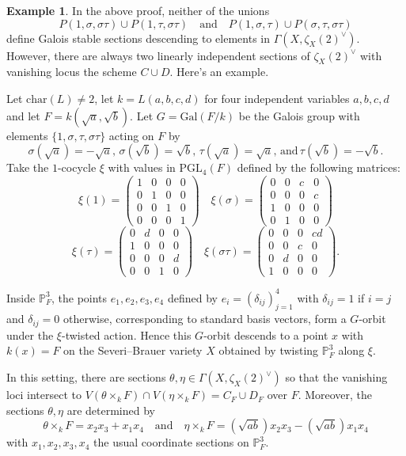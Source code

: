 \documentclass[12pt]{amsart}
\theoremstyle{definition}
\newtheorem{exmp}[thm]{Example}
\begin{document}
\begin{exmp}
In the above proof, neither of the unions \[P(1,\sigma,\sigma\tau)\cup P(1,\tau,\sigma\tau)\quad \mbox{and}\quad  P(1,\sigma,\tau)\cup P(\sigma,\tau,\sigma\tau)\] define Galois stable sections descending to elements in $\Gamma(X,\zeta_X(2)^\vee)$. However, there are always two linearly independent sections of $\zeta_X(2)^\vee$ with vanishing locus the scheme $C\cup D$. Here's an example.

Let $\mathrm{char}(L)\neq 2$, let $k=L(a,b,c,d)$ for four independent variables $a,b,c,d$ and let $F=k(\sqrt{a},\sqrt{b})$. Let $G=\mathrm{Gal}(F/k)$ be the Galois group with elements $\{1,\sigma,\tau,\sigma\tau\}$ acting on $F$ by \[\sigma(\sqrt{a})=-\sqrt{a},\, \sigma(\sqrt{b})=\sqrt{b},\, \tau(\sqrt{a})=\sqrt{a},\, \mbox{and}\,\tau(\sqrt{b})=-\sqrt{b}.\] Take the $1$-cocycle $\xi$ with values in $\mathrm{PGL}_4(F)$ defined by the following matrices: \[\xi(1)=\begin{pmatrix} 1 & 0 & 0 & 0\\ 0 & 1 & 0 & 0 \\ 0 & 0 & 1 & 0\\ 0 & 0 & 0 & 1\end{pmatrix} \quad \xi(\sigma)=\begin{pmatrix} 0 & 0 & c & 0\\ 0 & 0 & 0 & c \\ 1 & 0 & 0 & 0\\ 0 & 1 & 0 & 0\end{pmatrix}\] \[\xi(\tau)=\begin{pmatrix} 0 & d & 0 & 0\\ 1 & 0 & 0 & 0 \\ 0 & 0 & 0 & d\\ 0 & 0 & 1 & 0\end{pmatrix} \quad \xi(\sigma\tau)=\begin{pmatrix} 0 & 0 & 0 & cd\\ 0 & 0 & c & 0 \\ 0 & d & 0 & 0\\ 1 & 0 & 0 & 0\end{pmatrix}.\]

Inside $\mathbb{P}^3_F$, the points $e_1,e_2,e_3,e_4$ defined by $e_i=(\delta_{ij})_{j=1}^4$ with $\delta_{ij}=1$ if $i=j$ and $\delta_{ij}=0$ otherwise, corresponding to standard basis vectors, form a $G$-orbit under the $\xi$-twisted action. Hence this $G$-orbit descends to a point $x$ with $k(x)=F$ on the Severi--Brauer variety $X$ obtained by twisting $\mathbb{P}^3_F$ along $\xi$.

In this setting, there are sections $\theta,\eta\in \Gamma(X,\zeta_X(2)^\vee)$ so that the vanishing loci intersect to $V(\theta\times_k F)\cap V(\eta\times_k F)=C_F\cup D_F$ over $F$. Moreover, the sections $\theta,\eta$ are determined by \[\theta\times_k F=x_2x_3+x_1x_4\quad \mbox{and} \quad \eta\times_k F= (\sqrt{ab})x_2x_3-(\sqrt{ab})x_1x_4\] with $x_1,x_2,x_3,x_4$ the usual coordinate sections on $\mathbb{P}^3_F$.
\end{exmp}
\end{document}
